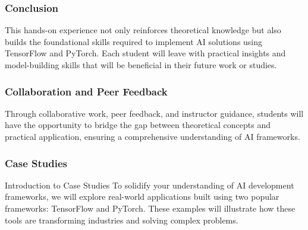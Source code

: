 \documentclass{beamer}
\begin{document}
\begin{frame}
    \frametitle{Conclusion}
    This hands-on experience not only reinforces theoretical knowledge but also builds the foundational skills required to implement AI solutions using TensorFlow and PyTorch. Each student will leave with practical insights and model-building skills that will be beneficial in their future work or studies.
\end{frame}

\begin{frame}
    \frametitle{Collaboration and Peer Feedback}
    Through collaborative work, peer feedback, and instructor guidance, students will have the opportunity to bridge the gap between theoretical concepts and practical application, ensuring a comprehensive understanding of AI frameworks.
\end{frame}

\begin{frame}
    \frametitle{Case Studies}
    \begin{block}{Introduction to Case Studies}
        To solidify your understanding of AI development frameworks, we will explore real-world applications built using two popular frameworks: TensorFlow and PyTorch. These examples will illustrate how these tools are transforming industries and solving complex problems.
    \end{block}
\end{frame}
\end{document}
